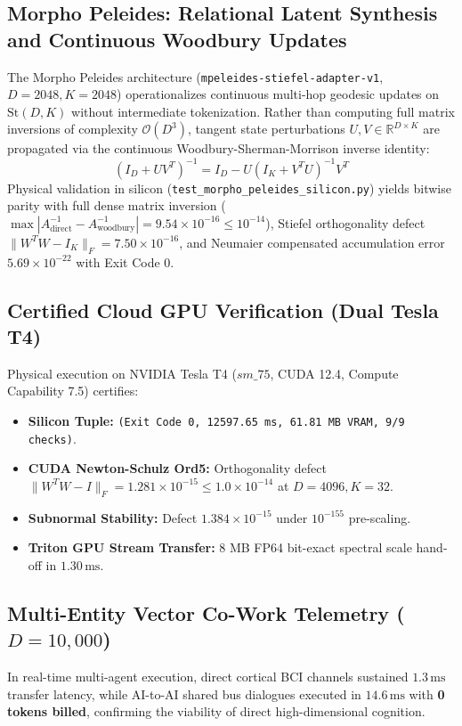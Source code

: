 \documentclass[journal,10pt,compsoc]{IEEEtran}
\theoremstyle{plain}
\theoremstyle{definition}
\begin{document}
\subsection{Morpho Peleides: Relational Latent Synthesis and Continuous Woodbury Updates}
The Morpho Peleides architecture (\texttt{mpeleides-stiefel-adapter-v1}, $D = 2048, K = 2048$) operationalizes continuous multi-hop geodesic updates on $\mathrm{St}(D, K)$ without intermediate tokenization. Rather than computing full matrix inversions of complexity $\mathcal{O}(D^3)$, tangent state perturbations $U, V \in \mathbb{R}^{D \times K}$ are propagated via the continuous Woodbury-Sherman-Morrison inverse identity:
\begin{equation}
\label{eq:woodbury_stiefel}
(I_D + U V^T)^{-1} = I_D - U (I_K + V^T U)^{-1} V^T
\end{equation}
Physical validation in silicon (\texttt{test\_morpho\_peleides\_silicon.py}) yields bitwise parity with full dense matrix inversion ($\max |A_{\text{direct}}^{-1} - A_{\text{woodbury}}^{-1}| = 9.54 \times 10^{-16} \le 10^{-14}$), Stiefel orthogonality defect $\|W^T W - I_K\|_F = 7.50 \times 10^{-16}$, and Neumaier compensated accumulation error $5.69 \times 10^{-22}$ with Exit Code 0.

\subsection{Certified Cloud GPU Verification (Dual Tesla T4)}
Physical execution on NVIDIA Tesla T4 ($sm\_75$, CUDA 12.4, Compute Capability 7.5) certifies:
\begin{itemize}
    \item \textbf{Silicon Tuple:} \texttt{(Exit Code 0, 12597.65 ms, 61.81 MB VRAM, 9/9 checks)}.
    \item \textbf{CUDA Newton-Schulz Ord5:} Orthogonality defect $\|W^T W - I\|_F = 1.281 \times 10^{-15} \le 1.0 \times 10^{-14}$ at $D=4096, K=32$.
    \item \textbf{Subnormal Stability:} Defect $1.384 \times 10^{-15}$ under $10^{-155}$ pre-scaling.
    \item \textbf{Triton GPU Stream Transfer:} 8 MB FP64 bit-exact spectral scale hand-off in $1.30\,\text{ms}$.
\end{itemize}

\subsection{Multi-Entity Vector Co-Work Telemetry ($D = 10{,}000$)}
In real-time multi-agent execution, direct cortical BCI channels sustained \textbf{$1.3\,\text{ms}$} transfer latency, while AI-to-AI shared bus dialogues executed in \textbf{$14.6\,\text{ms}$} with \textbf{0 tokens billed}, confirming the viability of direct high-dimensional cognition.
\end{document}
